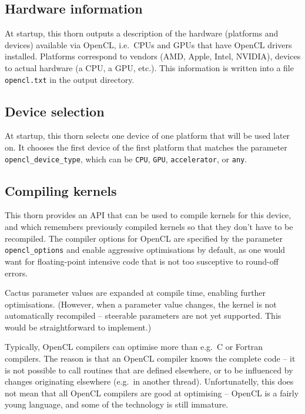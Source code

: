 \subsection{Hardware information}

At startup, this thorn outputs a description of the hardware
(platforms and devices) available via OpenCL, i.e.\ CPUs and GPUs that
have OpenCL drivers installed. Platforms correspond to vendors (AMD,
Apple, Intel, NVIDIA), devices to actual hardware (a CPU, a GPU,
etc.). This information is written into a file \texttt{opencl.txt} in
the output directory.

\subsection{Device selection}

At startup, this thorn selects one device of one platform that will be
used later on. It chooses the first device of the first platform that
matches the parameter \texttt{opencl\_device\_type}, which can be
\texttt{CPU}, \texttt{GPU}, \texttt{accelerator}, or \texttt{any}.

\subsection{Compiling kernels}

This thorn provides an API that can be used to compile kernels for
this device, and which remembers previously compiled kernels so that
they don't have to be recompiled. The compiler options for OpenCL are
specified by the parameter \texttt{opencl\_options} and enable
aggressive optimisations by default, as one would want for
floating-point intensive code that is not too susceptive to round-off
errors.

Cactus parameter values are expanded at compile time, enabling further
optimisations. (However, when a parameter value changes, the kernel is
not automatically recompiled -- steerable parameters are not yet
supported. This would be straightforward to implement.)

Typically, OpenCL compilers can optimise more than e.g.\ C or Fortran
compilers. The reason is that an OpenCL compiler knows the complete
code -- it is not possible to call routines that are defined
elsewhere, or to be influenced by changes originating elsewhere
(e.g.\ in another thread). Unfortunatelly, this does not mean that all
OpenCL compilers are good at optimising -- OpenCL is a fairly young
language, and some of the technology is still immature.

